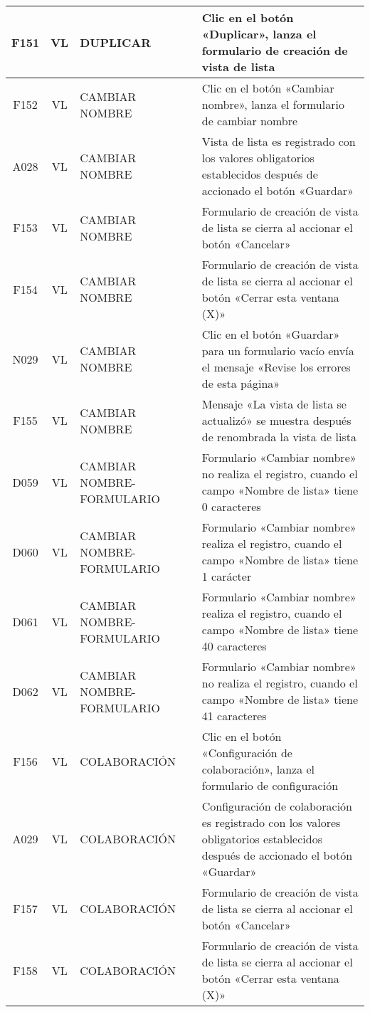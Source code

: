 \begin{landscape}
{\begin{longtable}[htb]{|c|c|p{5.0cm}|p{14.0cm}|}
F151 & VL & DUPLICAR & Clic en el botón «Duplicar», lanza el formulario de creación de vista de lista \\ \hline
F152 & VL & CAMBIAR NOMBRE & Clic en el botón «Cambiar nombre», lanza el formulario de cambiar nombre \\ \hline
A028 & VL & CAMBIAR NOMBRE & Vista de lista es registrado con los valores obligatorios establecidos después de accionado el botón «Guardar» \\ \hline
F153 & VL & CAMBIAR NOMBRE & Formulario de creación de vista de lista se cierra al accionar el botón «Cancelar» \\ \hline
F154 & VL & CAMBIAR NOMBRE & Formulario de creación de vista de lista se cierra al accionar el botón «Cerrar esta ventana (X)» \\ \hline
N029 & VL & CAMBIAR NOMBRE & Clic en el botón «Guardar» para un formulario vacío envía el mensaje «Revise los errores de esta página» \\ \hline
F155 & VL & CAMBIAR NOMBRE & Mensaje «La vista de lista se actualizó» se muestra después de renombrada la vista de lista \\ \hline
D059 & VL & CAMBIAR NOMBRE-FORMULARIO & Formulario «Cambiar nombre» no realiza el registro, cuando el campo «Nombre de lista» tiene 0 caracteres \\ \hline
D060 & VL & CAMBIAR NOMBRE-FORMULARIO & Formulario «Cambiar nombre» realiza el registro, cuando el campo «Nombre de lista» tiene 1 carácter \\ \hline
D061 & VL & CAMBIAR NOMBRE-FORMULARIO & Formulario «Cambiar nombre» realiza el registro, cuando el campo «Nombre de lista» tiene 40 caracteres \\ \hline
D062 & VL & CAMBIAR NOMBRE-FORMULARIO & Formulario «Cambiar nombre» no realiza el registro, cuando el campo «Nombre de lista» tiene 41 caracteres \\ \hline
F156 & VL & COLABORACIÓN & Clic en el botón «Configuración de colaboración», lanza el formulario de configuración \\ \hline
A029 & VL & COLABORACIÓN & Configuración de colaboración es registrado con los valores obligatorios establecidos después de accionado el botón «Guardar» \\ \hline
F157 & VL & COLABORACIÓN & Formulario de creación de vista de lista se cierra al accionar el botón «Cancelar» \\ \hline
F158 & VL & COLABORACIÓN & Formulario de creación de vista de lista se cierra al accionar el botón «Cerrar esta ventana (X)» \\ \hline

\end{longtable}}
\end{landscape}
